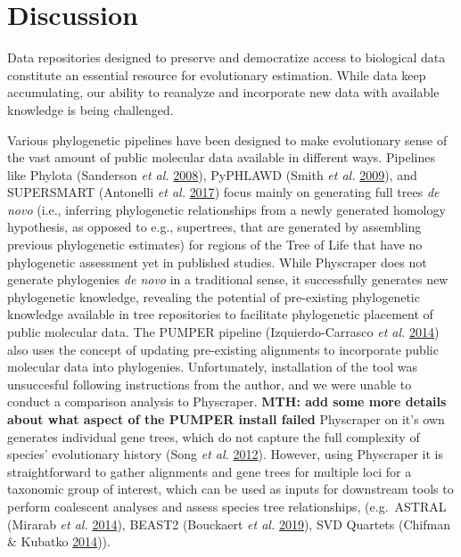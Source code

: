 \documentclass[]{article}
\begin{document}
\hypertarget{discussion}{%
\section{Discussion}\label{discussion}}

Data repositories designed to preserve and democratize access to biological data
constitute an essential resource for evolutionary estimation. While data keep accumulating,
our ability to reanalyze and incorporate new data with available knowledge is being challenged.

Various phylogenetic pipelines have been designed to make evolutionary sense of the vast amount of public molecular data available in different ways.
Pipelines like Phylota (Sanderson \emph{et al.} \protect\hyperlink{ref-sanderson2008phylota}{2008}), PyPHLAWD (Smith \emph{et al.} \protect\hyperlink{ref-smith2009mega}{2009}), and SUPERSMART (Antonelli \emph{et al.} \protect\hyperlink{ref-antonelli2017toward}{2017})
focus mainly on generating full trees \emph{de novo} (i.e., inferring phylogenetic relationships from a newly generated homology hypothesis, as opposed to e.g., supertrees, that are generated by assembling previous phylogenetic estimates) for regions of the Tree of
Life that have no phylogenetic assessment yet in published studies.
While Physcraper does not generate phylogenies \emph{de novo} in a traditional sense,
it successfully generates new phylogenetic knowledge, revealing the potential of pre-existing
phylogenetic knowledge available in tree repositories to facilitate phylogenetic placement of public molecular data.
The PUMPER pipeline (Izquierdo-Carrasco \emph{et al.} \protect\hyperlink{ref-izquierdo2014pumper}{2014}) also uses the concept of updating
pre-existing alignments to incorporate public molecular data into phylogenies. Unfortunately, installation of the tool was unsuccesful following instructions from the author, and we were unable to conduct a comparison analysis to Physcraper. \textbf{MTH: add some more details about what aspect of the PUMPER install failed}
Physcraper on it's own generates individual gene trees, which do not capture the full complexity of species' evolutionary history (Song \emph{et al.} \protect\hyperlink{ref-song2012resolving}{2012}). However, using Physcraper it is straightforward to gather alignments and gene trees for multiple loci for a taxonomic group of interest, which can be used as inputs for downstream tools to perform coalescent analyses and assess species tree relationships, (e.g.~ASTRAL (Mirarab \emph{et al.} \protect\hyperlink{ref-mirarab2014astral}{2014}), BEAST2 (Bouckaert \emph{et al.} \protect\hyperlink{ref-bouckaert2019beast}{2019}), SVD Quartets (Chifman \& Kubatko \protect\hyperlink{ref-chifman2014quartet}{2014})).
\end{document}
